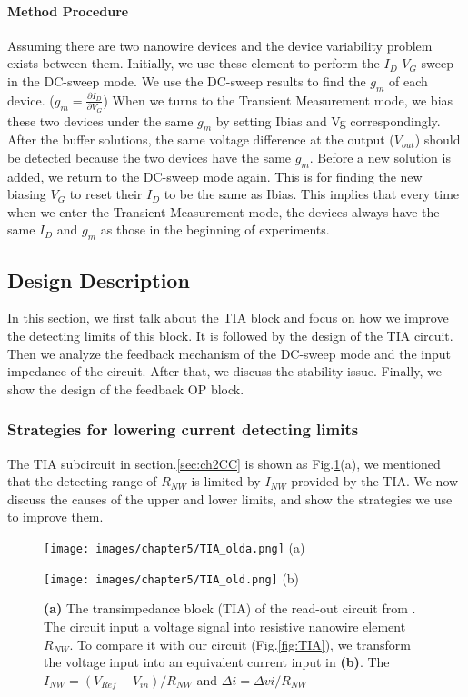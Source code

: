 \paragraph*{Method Procedure}
Assuming there are two nanowire devices and the device variability problem exists between them.
Initially, we use these element to perform the $I_D$-$V_G$ sweep in the DC-sweep mode.
We use the DC-sweep results to find the $g_m$ of each device. ($g_m = \frac{\partial I_D}{\partial V_G}$)
When we turns to the Transient Measurement mode, we bias these two devices under the same $g_m$ by setting Ibias and Vg correspondingly.
After the buffer solutions, the same voltage difference at the output ($V_{out}$) should be detected because the two devices have the same $g_m$.
Before a new solution is added, we return to the DC-sweep mode again.
This is for finding the new biasing $V_G$ to reset their $I_D$ to be the same as Ibias.
This implies that every time when we enter the Transient Measurement mode, the devices always have the same $I_D$ and $g_m$ as those in the beginning of experiments.


\subsection{Design Description}
In this section, we first talk about the TIA block and focus on how we improve the detecting limits of this block.
It is followed by the design of the TIA circuit.
Then we analyze the feedback mechanism of the DC-sweep mode and the input impedance of the circuit.
After that, we discuss the stability issue.
Finally, we show the design of the feedback OP block.

\subsubsection{Strategies for lowering current detecting limits} \label{sec:Ibias}
The TIA subcircuit in section.\ref{sec:ch2CC} is shown as Fig.\ref{fig:TIA_old}(a), we mentioned that the detecting range of $R_{NW}$ is limited by $I_{NW}$ provided by the TIA.
We now discuss the causes of the upper and lower limits, and show the strategies we use to improve them.

\begin{figure}[!htbp]
    \centering
    \begin{minipage}[t]{0.4\textwidth}
        \texttt{[image: images/chapter5/TIA\_olda.png]}
        (a)
    \end{minipage}
    \hfill
    \begin{minipage}[t]{0.4\textwidth}
        \texttt{[image: images/chapter5/TIA\_old.png]}
        (b)
    \end{minipage}
    \caption{\textbf{(a)} The transimpedance block (TIA) of the read-out circuit from \cite{Jlockin}. The circuit input a voltage signal into resistive nanowire element $R_{NW}$.
            To compare it with our circuit (Fig.\ref{fig:TIA}), we transform the voltage input into an equivalent current input in \textbf{(b)}. The $I_{NW} = (V_{Ref} - V_{in})/R_{NW}$ and $\Delta i = \Delta vi /R_{NW}$}
    \label{fig:TIA_old}
\end{figure}


